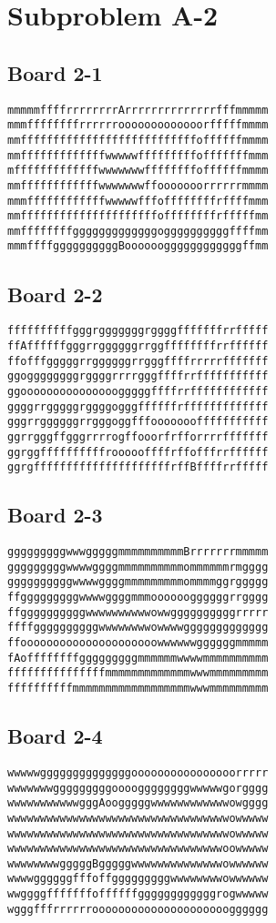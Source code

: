 \documentclass[11pt,a4paper]{article}
\begin{document}
\section*{Subproblem A-2}
\subsection*{Board 2-1}
\begin{lstlisting}
mmmmmffffrrrrrrrrArrrrrrrrrrrrrrfffmmmmm
mmmffffffffrrrrrrooooooooooooorfffffmmmm
mmfffffffffffffffffffffffffffoffffffmmmm
mmfffffffffffffwwwwwfffffffffofffffffmmm
mfffffffffffffwwwwwwwffffffffoffffffmmmm
mmffffffffffffwwwwwwwffooooooorrrrrrmmmm
mmmffffffffffffwwwwwfffoffffffffrffffmmm
mmfffffffffffffffffffffoffffffffrfffffmm
mmffffffffgggggggggggggoggggggggggffffmm
mmmffffggggggggggBooooooggggggggggggffmm
\end{lstlisting}

\subsection*{Board 2-2}
\begin{lstlisting}
ffffffffffgggrgggggggrggggfffffffrrfffff
ffAffffffgggrrggggggrrggffffffffrrffffff
ffofffgggggrrggggggrrgggffffrrrrrfffffff
ggoggggggggrggggrrrrgggffffrrfffffffffff
ggooooooooooooooogggggffffrrffffffffffff
ggggrrgggggrggggogggffffffrfffffffffffff
gggrrggggggrrgggoggfffooooooofffffffffff
ggrrgggffgggrrrrogffooorfrfforrrrfffffff
ggrggffffffffffroooooffffrffofffrrffffff
ggrgfffffffffffffffffffffrffBffffrrfffff
\end{lstlisting}

\subsection*{Board 2-3}
\begin{lstlisting}
gggggggggwwwgggggmmmmmmmmmmBrrrrrrrmmmmm
gggggggggwwwwggggmmmmmmmmmmommmmmmrmgggg
ggggggggggwwwwggggmmmmmmmmmommmmggrggggg
ffgggggggggwwwwggggmmmooooooggggggrrgggg
ffggggggggggwwwwwwwwwwowwggggggggggrrrrr
ffffggggggggggwwwwwwwwowwwwggggggggggggg
ffooooooooooooooooooooowwwwwwggggggmmmmm
fAoffffffffgggggggggmmmmmmwwwwmmmmmmmmmm
fffffffffffffffmmmmmmmmmmmmmwwwmmmmmmmmm
ffffffffffmmmmmmmmmmmmmmmmmmwwwmmmmmmmmm
\end{lstlisting}

\subsection*{Board 2-4}
\begin{lstlisting}
wwwwwggggggggggggggoooooooooooooooorrrrr
wwwwwwwgggggggggooooggggggggwwwwwgorgggg
wwwwwwwwwwwgggAoogggggwwwwwwwwwwwwowgggg
wwwwwwwwwwwwwwwwwwwwwwwwwwwwwwwwwwowwwww
wwwwwwwwwwwwwwwwwwwwwwwwwwwwwwwwwwowwwww
wwwwwwwwwwwwwwwwwwwwwwwwwwwwwwwwwoowwwww
wwwwwwwwgggggBgggggwwwwwwwwwwwwwwowwwwww
wwwwggggggfffoffgggggggggwwwwwwwwowwwwww
wwggggfffffffoffffffggggggggggggrogwwwww
wgggfffrrrrrrooooooooooooooooooooogggggg
\end{lstlisting}
\end{document}
